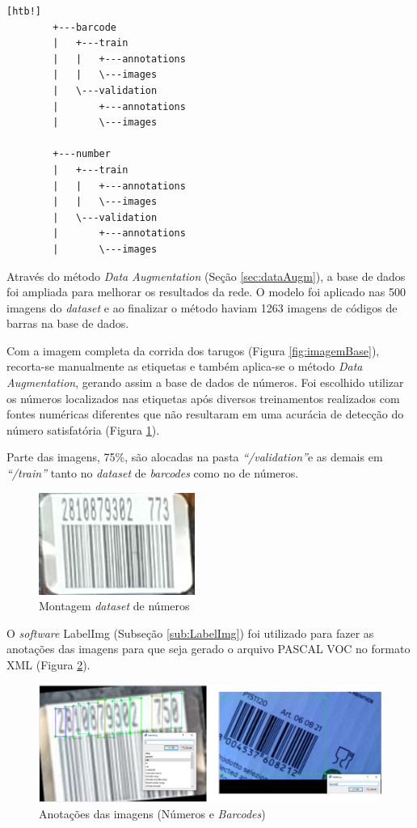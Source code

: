 \begin{lstlisting}[caption=Divisão dos arquivos para dataset, label=cod:folders][htb!]
        +---barcode
        |   +---train
        |   |   +---annotations
        |   |   \---images
        |   \---validation
        |       +---annotations
        |       \---images
        
        +---number
        |   +---train
        |   |   +---annotations
        |   |   \---images
        |   \---validation
        |       +---annotations
        |       \---images
\end{lstlisting}

Através do método \textit{Data Augmentation} (Seção \ref{sec:dataAugm}), a base de dados foi ampliada para melhorar os resultados da rede. O modelo foi aplicado nas 500 imagens do \textit{dataset} e ao finalizar o método haviam 1263 imagens de códigos de barras na base de dados.

Com a imagem completa da corrida dos tarugos (Figura \ref{fig:imagemBase}), recorta-se manualmente as etiquetas e também aplica-se o método \textit{Data Augmentation}, gerando assim a base de dados de números. Foi escolhido utilizar os números localizados nas etiquetas após diversos treinamentos realizados com fontes numéricas diferentes que não resultaram em uma acurácia de detecção do número satisfatória (Figura \ref{fig:barcodeDataset}).

Parte das imagens, 75\%, são alocadas na pasta \textit{\enquote{/validation}}e as demais em \textit{\enquote{/train}}  tanto no \textit{dataset} de \textit{barcodes} como no de números.

\begin{figure}[H]
	\centering
	\includegraphics[width=0.25\linewidth]{figuras/MachineLearning/barcodeDataset.png}
	\caption{Montagem \textit{dataset} de números}
	\label{fig:barcodeDataset}
\end{figure}

O \textit{software} LabelImg (Subseção \ref{sub:LabelImg}) foi utilizado para fazer as anotações das imagens para que seja gerado o arquivo PASCAL VOC no formato XML (Figura \ref{fig:barNumAn}).

\begin{figure}[htbp]
	\centering
	\includegraphics[width=0.9\linewidth]{figuras/MachineLearning/barNumAn.png}
	\caption{Anotações das imagens (Números e \textit{Barcodes})}
	\label{fig:barNumAn}
\end{figure}

